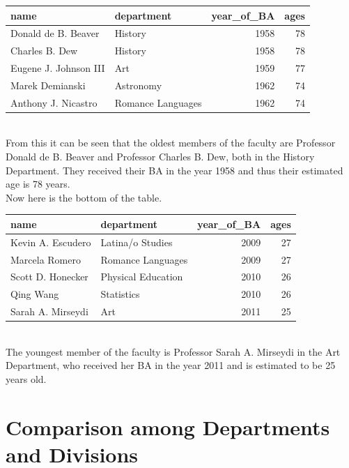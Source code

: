 \documentclass{article}\usepackage[]{graphicx}\usepackage[]{color}
\newenvironment{knitrout}{}{} %
\begin{document}
\begin{knitrout}
\color{fgcolor}
\begin{tabular}{l|l|r|r}
\hline
name & department & year\_of\_BA & ages\\
\hline
Donald de B. Beaver & History & 1958 & 78\\
\hline
Charles B. Dew & History & 1958 & 78\\
\hline
Eugene J. Johnson III & Art & 1959 & 77\\
\hline
Marek Demianski & Astronomy & 1962 & 74\\
\hline
Anthony J. Nicastro & Romance Languages & 1962 & 74\\
\hline
\end{tabular}


\end{knitrout}
\hfill
\\
From this it can be seen that the oldest members of the faculty are Professor Donald de B. Beaver and Professor Charles B. Dew, both in the History Department. They received their BA in the year 1958 and thus their estimated age is 78 years.\\

Now here is the bottom of the table.\\

\begin{knitrout}
\color{fgcolor}
\begin{tabular}{l|l|r|r}
\hline
name & department & year\_of\_BA & ages\\
\hline
Kevin A. Escudero & Latina/o Studies & 2009 & 27\\
\hline
Marcela Romero & Romance Languages & 2009 & 27\\
\hline
Scott D. Honecker & Physical Education & 2010 & 26\\
\hline
Qing Wang & Statistics & 2010 & 26\\
\hline
Sarah A. Mirseydi & Art & 2011 & 25\\
\hline
\end{tabular}


\end{knitrout}
\hfill
\\
The youngest member of the faculty is Professor Sarah A. Mirseydi in the Art Department, who received her BA in the year 2011 and is estimated to be 25 years old.\\

\section{Comparison among Departments and Divisions}
\end{document}
